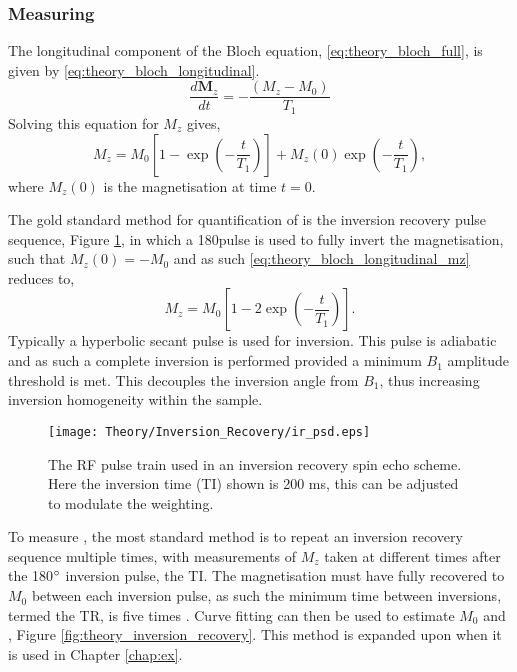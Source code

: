 \subsubsection{Measuring \tone}
The longitudinal component of the Bloch equation, \eqref{eq:theory_bloch_full}, is given by \eqref{eq:theory_bloch_longitudinal}.
\begin{equation}
\frac{d\mathbf{M}_z}{dt} = - \frac{\left( M_z - M_0 \right)}{T_1}
\label{eq:theory_bloch_longitudinal}
\end{equation}
Solving this equation for $M_z$ gives,
\begin{equation}
M_z = M_0 \left[1 - \exp\left(-\frac{t}{T_1}\right) \right] + M_z\left( 0 \right) \exp \left(-\frac{t}{T_1}\right), 
\label{eq:theory_bloch_longitudinal_mz}
\end{equation}
where $M_z\left( 0 \right)$ is the magnetisation at time $t=0$.

\newpage
The gold standard method for quantification of \tone is the inversion recovery pulse sequence, Figure \ref{fig:theory_inversion_recovery_psd}, in which a 180\degree{ }pulse is used to fully invert the magnetisation, such that $M_z(0) = -M_0$ and as such \eqref{eq:theory_bloch_longitudinal_mz} reduces to,
\begin{equation}
M_z = M_0 \left[1 - 2\exp\left(-\frac{t}{T_1}\right) \right].
\label{eq:theory_bloch_longitudinal_mz_inversion}
\end{equation}
Typically a hyperbolic secant pulse is used for inversion. This pulse is adiabatic and as such a complete inversion is performed provided a minimum $B_1$ amplitude threshold is met. This decouples the inversion angle from $B_1$, thus increasing inversion homogeneity within the sample.

\begin{figure}[H]
	\centering
	\texttt{[image: Theory/Inversion\_Recovery/ir\_psd.eps]}
	\caption{The \ac{RF} pulse train used in an inversion recovery spin echo scheme. Here the inversion time (\acs*{TI}) shown is 200 ms, this can be adjusted to modulate the \tone weighting.}
	\label{fig:theory_inversion_recovery_psd}	
\end{figure}

To measure \tone, the most standard method is to repeat an inversion recovery sequence multiple times, with measurements of $M_z$ taken at different times after the 180$\degree$ inversion pulse, the \ac{TI}. The magnetisation must have fully recovered to $M_0$ between each inversion pulse, as such the minimum time between inversions, termed the \ac{TR}, is five times \tone. Curve fitting can then be used to estimate $M_0$ and \tone, Figure \ref{fig:theory_inversion_recovery}.
This method is expanded upon when it is used in Chapter \ref{chap:ex}.



